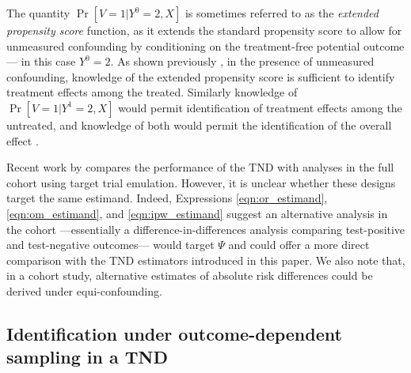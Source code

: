 \documentclass[11pt]{article}
\begin{document}
\begin{remark}
The quantity $\Pr[V = 1 | Y^0 = 2, X]$ is sometimes referred to as the \textit{extended propensity score} function, as it extends the standard propensity score to allow for unmeasured confounding by conditioning on the treatment-free potential outcome --- in this case $Y^0 = 2$. As shown previously \cite{tchetgen_single_2023}, in the presence of unmeasured confounding, knowledge of the extended propensity score is sufficient to identify treatment effects among the treated. Similarly knowledge of $\Pr[V = 1 | Y^1 = 2, X]$ would permit identification of treatment effects among the untreated, and knowledge of both would permit the identification of the overall effect \cite{tchetgen_single_2023}.
\end{remark}

\begin{remark}
Recent work by \textcite{li2024comparison} compares the performance of the TND with analyses in the full cohort using target trial emulation. However, it is unclear whether these designs target the same estimand. Indeed, Expressions \ref{eqn:or_estimand}, \ref{eqn:om_estimand}, and \ref{eqn:ipw_estimand} suggest an alternative analysis in the cohort ---essentially a difference-in-differences analysis comparing test-positive and test-negative outcomes--- would target $\Psi$ and could offer a more direct comparison with the TND estimators introduced in this paper. We also note that, in a cohort study, alternative estimates of absolute risk differences could be derived under equi-confounding.
\end{remark}

\subsection*{Identification under outcome-dependent sampling in a TND}
\end{document}
